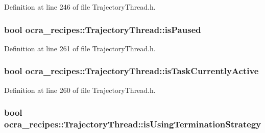 Definition at line 246 of file Trajectory\+Thread.\+h.

\subsubsection[{\texorpdfstring{is\+Paused}{isPaused}}]{\setlength{\rightskip}{0pt plus 5cm}bool ocra\+\_\+recipes\+::\+Trajectory\+Thread\+::is\+Paused\hspace{0.3cm}{\ttfamily [protected]}}\hypertarget{classocra__recipes_1_1TrajectoryThread_a08dc8a4a78b61d6b3d1e38e82b809493}{}\label{classocra__recipes_1_1TrajectoryThread_a08dc8a4a78b61d6b3d1e38e82b809493}


Definition at line 261 of file Trajectory\+Thread.\+h.

\subsubsection[{\texorpdfstring{is\+Task\+Currently\+Active}{isTaskCurrentlyActive}}]{\setlength{\rightskip}{0pt plus 5cm}bool ocra\+\_\+recipes\+::\+Trajectory\+Thread\+::is\+Task\+Currently\+Active\hspace{0.3cm}{\ttfamily [protected]}}\hypertarget{classocra__recipes_1_1TrajectoryThread_a7f185a5b52a00b7e5bce78e5ffb77d97}{}\label{classocra__recipes_1_1TrajectoryThread_a7f185a5b52a00b7e5bce78e5ffb77d97}


Definition at line 260 of file Trajectory\+Thread.\+h.

\subsubsection[{\texorpdfstring{is\+Using\+Termination\+Strategy}{isUsingTerminationStrategy}}]{\setlength{\rightskip}{0pt plus 5cm}bool ocra\+\_\+recipes\+::\+Trajectory\+Thread\+::is\+Using\+Termination\+Strategy\hspace{0.3cm}{\ttfamily [protected]}}\hypertarget{classocra__recipes_1_1TrajectoryThread_adb4b6cffdd2a797c95b54642e13502d2}{}\label{classocra__recipes_1_1TrajectoryThread_adb4b6cffdd2a797c95b54642e13502d2}


